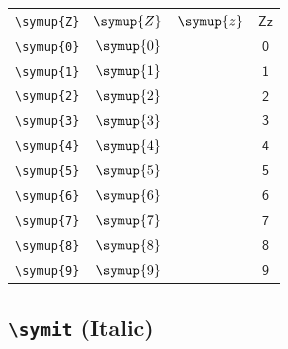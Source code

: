 \documentclass[12pt,a4paper]{article}
\begin{document}
\begin{longtable}{|c|c|c|c|}
\verb|\symup{Z}| & $\symup{Z}$ & $\symup{z}$ & $ 𝖹 𝗓 $ \\
\verb|\symup{0}| & $\symup{0}$ & & $ 𝟢 $ \\
\verb|\symup{1}| & $\symup{1}$ & & $ 𝟣 $ \\
\verb|\symup{2}| & $\symup{2}$ & & $ 𝟤 $ \\
\verb|\symup{3}| & $\symup{3}$ & & $ 𝟥 $ \\
\verb|\symup{4}| & $\symup{4}$ & & $ 𝟦 $ \\
\verb|\symup{5}| & $\symup{5}$ & & $ 𝟧 $ \\
\verb|\symup{6}| & $\symup{6}$ & & $ 𝟨 $ \\
\verb|\symup{7}| & $\symup{7}$ & & $ 𝟩 $ \\
\verb|\symup{8}| & $\symup{8}$ & & $ 𝟪 $ \\
\verb|\symup{9}| & $\symup{9}$ & & $ 𝟫 $ \\
\hline
\end{longtable}

\newpage

\subsection*{\texttt{\textbackslash{}symit} (Italic)}
\end{document}
